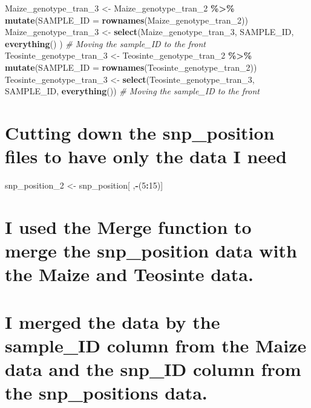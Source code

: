 \documentclass[
]{article}
\newenvironment{Shaded}{\begin{snugshade}}{\end{snugshade}}
\newcommand{\AttributeTok}[1]{\textcolor[rgb]{0.13,0.29,0.53}{#1}}
\newcommand{\CommentTok}[1]{\textcolor[rgb]{0.56,0.35,0.01}{\textit{#1}}}
\newcommand{\DecValTok}[1]{\textcolor[rgb]{0.00,0.00,0.81}{#1}}
\newcommand{\FunctionTok}[1]{\textcolor[rgb]{0.13,0.29,0.53}{\textbf{#1}}}
\newcommand{\NormalTok}[1]{#1}
\newcommand{\OtherTok}[1]{\textcolor[rgb]{0.56,0.35,0.01}{#1}}
\newcommand{\SpecialCharTok}[1]{\textcolor[rgb]{0.81,0.36,0.00}{\textbf{#1}}}
\begin{document}
\begin{Shaded}
\begin{Highlighting}[]
\NormalTok{Maize\_genotype\_tran\_3 }\OtherTok{\textless{}{-}}\NormalTok{ Maize\_genotype\_tran\_2 }\SpecialCharTok{\%\textgreater{}\%} \FunctionTok{mutate}\NormalTok{(}\AttributeTok{SAMPLE\_ID =} \FunctionTok{rownames}\NormalTok{(Maize\_genotype\_tran\_2))}
\NormalTok{Maize\_genotype\_tran\_3 }\OtherTok{\textless{}{-}} \FunctionTok{select}\NormalTok{(Maize\_genotype\_tran\_3, SAMPLE\_ID, }\FunctionTok{everything}\NormalTok{() ) }\CommentTok{\# Moving the sample\_ID to the front}
\NormalTok{Teosinte\_genotype\_tran\_3 }\OtherTok{\textless{}{-}}\NormalTok{ Teosinte\_genotype\_tran\_2 }\SpecialCharTok{\%\textgreater{}\%} \FunctionTok{mutate}\NormalTok{(}\AttributeTok{SAMPLE\_ID =} \FunctionTok{rownames}\NormalTok{(Teosinte\_genotype\_tran\_2))}
\NormalTok{Teosinte\_genotype\_tran\_3 }\OtherTok{\textless{}{-}} \FunctionTok{select}\NormalTok{(Teosinte\_genotype\_tran\_3, SAMPLE\_ID, }\FunctionTok{everything}\NormalTok{()) }\CommentTok{\# Moving the sample\_ID to the front}
\end{Highlighting}
\end{Shaded}

\section{Cutting down the snp\_position files to have only the data I
need}\label{cutting-down-the-snp_position-files-to-have-only-the-data-i-need}

\begin{Shaded}
\begin{Highlighting}[]
\NormalTok{snp\_position\_2 }\OtherTok{\textless{}{-}}\NormalTok{ snp\_position[ ,}\SpecialCharTok{{-}}\NormalTok{(}\DecValTok{5}\SpecialCharTok{:}\DecValTok{15}\NormalTok{)]}
\end{Highlighting}
\end{Shaded}

\section{I used the Merge function to merge the snp\_position data with
the Maize and Teosinte
data.}\label{i-used-the-merge-function-to-merge-the-snp_position-data-with-the-maize-and-teosinte-data.}

\section{I merged the data by the sample\_ID column from the Maize data
and the snp\_ID column from the snp\_positions
data.}\label{i-merged-the-data-by-the-sample_id-column-from-the-maize-data-and-the-snp_id-column-from-the-snp_positions-data.}
\end{document}
